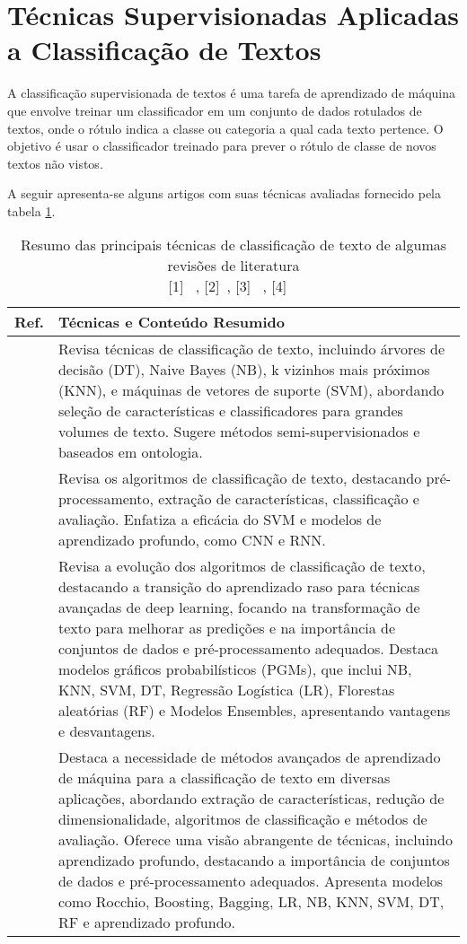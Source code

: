 \section{Técnicas Supervisionadas Aplicadas a Classificação de Textos}

A classificação supervisionada de textos é uma tarefa de aprendizado de máquina que envolve treinar um classificador em um conjunto de dados rotulados de textos, onde o rótulo indica a classe ou categoria a qual cada texto pertence. O objetivo é usar o classificador treinado para prever o rótulo de classe de novos textos não vistos.

A seguir apresenta-se alguns artigos com suas técnicas avaliadas fornecido pela tabela \ref{tab:ml_techniques}.

\begin{table}[h]
\centering
\caption{Resumo das principais técnicas de classificação de texto de algumas revisões de literatura \\ \footnotesize{[1] ~\cite{aggarwal2018review}, [2]~\cite{bhavani2021review}, [3] ~\cite{gasparetto2022survey}, [4] ~\cite{kowsari2019text}}}

\label{tab:ml_techniques}
\begin{tabularx}{\textwidth}{c|>{\small}X}
\hline
\textbf{Ref.} & \textbf{Técnicas e Conteúdo Resumido} \\
\hline
[1] & Revisa técnicas de classificação de texto, incluindo árvores de decisão (DT), Naive Bayes (NB), k vizinhos mais próximos (KNN), e máquinas de vetores de suporte (SVM), abordando seleção de características e classificadores para grandes volumes de texto. Sugere métodos semi-supervisionados e baseados em ontologia. \\
\hline
[2] & Revisa os algoritmos de classificação de texto, destacando pré-processamento, extração de características, classificação e avaliação. Enfatiza a eficácia do SVM e modelos de aprendizado profundo, como CNN e RNN. \\
\hline
[3] & Revisa a evolução dos algoritmos de classificação de texto, destacando a transição do aprendizado raso para técnicas avançadas de deep learning, focando na transformação de texto para melhorar as predições e na importância de conjuntos de dados e pré-processamento adequados. Destaca modelos gráficos probabilísticos (PGMs), que inclui NB, KNN, SVM, DT, Regressão Logística (LR), Florestas aleatórias (RF) e Modelos Ensembles, apresentando vantagens e desvantagens. \\
\hline
[4] & Destaca a necessidade de métodos avançados de aprendizado de máquina para a classificação de texto em diversas aplicações, abordando extração de características, redução de dimensionalidade, algoritmos de classificação e métodos de avaliação. Oferece uma visão abrangente de técnicas, incluindo aprendizado profundo, destacando a importância de conjuntos de dados e pré-processamento adequados. Apresenta modelos como Rocchio, Boosting, Bagging, LR, NB, KNN, SVM, DT, RF e aprendizado profundo. \\
\hline
\end{tabularx}
\end{table}

